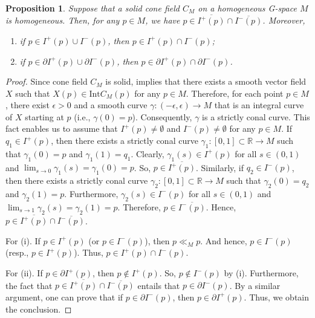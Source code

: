 \documentclass[a4paper,11pt]{article}
\theoremstyle{plain}
\newtheorem{prop}[thm]{Proposition}
\theoremstyle{definition}
\numberwithin{equation}{section}
\begin{document}
	\begin{prop}\label{chronological boundary}
		Suppose that a solid cone field $C_M$ on a homogeneous G-space $M$ is homogeneous. Then, for any $p\in M$, we have $p\in \overline{I^{+}(p)}\cap \overline{I^{-}(p)}$. Moreover,
		\begin{enumerate}[{\rm (i)}]
			\item if $p\in I^{+}(p)\cup I^{-}(p)$, then $p\in I^{+}(p)\cap I^{-}(p)$;
			
			\item if $p\in \partial I^{+}(p)\cup \partial I^{-}(p)$, then $p\in \partial I^{+}(p)\cap \partial I^{-}(p)$.
		\end{enumerate}
	\end{prop}	
	\begin{proof}
		Since cone field $C_M$ is solid, \cite[Proposition 4.6]{Lawson89} implies that there exists a smooth vector field $X$ such that $X(p)\in \text{Int} C_M(p)$ for any $p\in M$. Therefore, for each point $p\in M$, there exist $\epsilon>0$ and a smooth curve $\gamma \colon (-\epsilon,\epsilon)\to M$ that is an integral curve of $X$ starting at $p$ (i.e., $\gamma(0)=p$). Consequently, $\gamma$ is a strictly conal curve. This fact enables us to assume that $I^{+}(p)\neq \emptyset$ and $I^{-}(p)\neq \emptyset$ for any $p\in M$.
		If $q_1\in I^{+}(p)$, then there exists a strictly conal curve $\gamma_1 \colon [0,1] \subset \mathbb{R} \to M$ such that $\gamma_1(0)=p$ and $\gamma_1(1)=q_1$. Clearly, $\gamma_1(s)\in I^{+}(p)$ for all $s\in (0,1)$ and $\lim_{s\to 0}\gamma_1(s)=\gamma_1(0)=p$. So, $p\in \overline{I^{+}(p)}$. Similarly, if $q_2\in I^{-}(p)$, then there exists a strictly conal curve $\gamma_2 \colon [0,1] \subset \mathbb{R} \to M$ such that $\gamma_2(0)=q_2$ and $\gamma_2(1)=p$. Furthermore, $\gamma_2(s)\in I^{-}(p)$ for all $s\in (0,1)$ and $\lim_{s\to 1}\gamma_2(s)=\gamma_2(1)=p$. Therefore, $p\in \overline{I^{-}(p)}$. Hence, $p\in \overline{I^{+}(p)}\cap \overline{I^{-}(p)}$.
		
		For (i). If $p\in I^{+}(p)$ (or $p\in I^{-}(p)$), then $p\ll_M p$. And hence, $p\in I^{-}(p)$ (resp., $p\in I^{+}(p)$). Thus, $p\in I^{+}(p)\cap I^{-}(p)$.
		
		For (ii). If $p\in \partial I^{+}(p)$, then $p\notin I^{+}(p)$. So, $p\notin I^{-}(p)$ by (i). Furthermore, the fact that $p\in \overline{I^{+}(p)}\cap \overline{I^{-}(p)}$ entails that $p\in \partial I^{-}(p)$. By a similar argument, one can prove that if $p\in \partial I^{-}(p)$, then $p\in \partial I^{+}(p)$. Thus, we obtain the conclusion.
	\end{proof}
	
\end{document}
